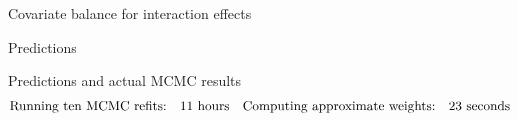 \begin{frame}{Covariate balance for interaction effects}
\LaxImbalanceInteraction{}
\end{frame}




\begin{frame}[t]{Predictions}
    \LaxPredictionFigOne{}
\end{frame}


\begin{frame}[t]{Predictions and actual MCMC results}
    \LaxPredictionFigTwo{}
    \vspace{-3em}
    $$
    \begin{aligned}
        \textrm{Running ten MCMC refits:}\quad & 11 \textrm{ hours} &
        \textrm{Computing approximate weights:}\quad &23 \textrm{ seconds}\\
    \end{aligned}
    $$
\end{frame}







\def\res{\varepsilon}
\def\w{w}
\def\wtil{\tilde{\w}}
\def\reshat{\hat{\res}}

\def\methodrow#1#2#3{
\begin{minipage}[t]{0.15\textwidth}
    \centering
    #1
\end{minipage}
\hfill
\begin{minipage}[t]{0.4\textwidth}
    \centering
    \vspace{-2em}
    #2
    \pause
\end{minipage}
\hfill
\begin{minipage}[t]{0.4\textwidth}
    \centering
    \vspace{-2em}
    #3
    \pause
\end{minipage}
}


\def\methodspacer{
    \vspace{1em}
    \hrule
    \vspace{1em}
}


